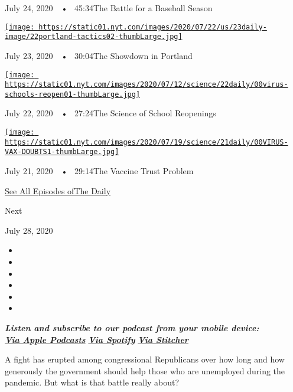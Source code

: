 July 24, 2020~~•~ 45:34The Battle for a Baseball Season

\href{https://www.nytimes.com/2020/07/23/podcasts/the-daily/portland-protests.html?action=click\&module=audio-series-bar\&region=header\&pgtype=Article}{\texttt{[image: https://static01.nyt.com/images/2020/07/22/us/23daily-image/22portland-tactics02-thumbLarge.jpg]}}

July 23, 2020~~•~ 30:04The Showdown in Portland

\href{https://www.nytimes.com/2020/07/22/podcasts/the-daily/school-reopenings-coronavirus.html?action=click\&module=audio-series-bar\&region=header\&pgtype=Article}{\texttt{[image: https://static01.nyt.com/images/2020/07/12/science/22daily/00virus-schools-reopen01-thumbLarge.jpg]}}

July 22, 2020~~•~ 27:24The Science of School Reopenings

\href{https://www.nytimes.com/2020/07/21/podcasts/the-daily/coronavirus-vaccine.html?action=click\&module=audio-series-bar\&region=header\&pgtype=Article}{\texttt{[image: https://static01.nyt.com/images/2020/07/19/science/21daily/00VIRUS-VAX-DOUBTS1-thumbLarge.jpg]}}

July 21, 2020~~•~ 29:14The Vaccine Trust Problem

\href{https://www.nytimes.com/column/the-daily}{See All Episodes ofThe
Daily}

Next

July 28, 2020

\begin{itemize}
\item
\item
\item
\item
\item
\item
\end{itemize}

\emph{\textbf{Listen and subscribe to our podcast from your mobile
device:}}\\
\textbf{\href{https://itunes.apple.com/us/podcast/the-daily/id1200361736?mt=2}{\emph{Via
Apple Podcasts}}} \emph{\textbf{\textbar{}}}
\textbf{\href{https://open.spotify.com/show/3IM0lmZxpFAY7CwMuv9H4g?si=SfuMSC55R1qprFsRZU3_zw}{\emph{Via
Spotify}}} \emph{\textbf{\textbar{}}}
\textbf{\href{http://www.stitcher.com/podcast/the-new-york-times/the-daily-10}{\emph{Via
Stitcher}}}

A fight has erupted among congressional Republicans over how long and
how generously the government should help those who are unemployed
during the pandemic. But what is that battle really about?


